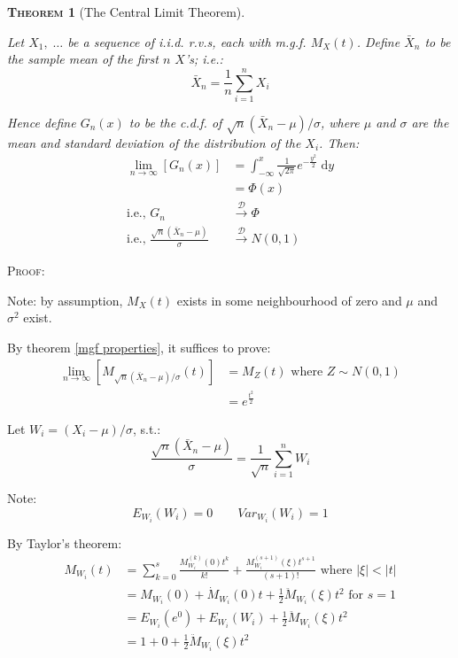 \documentclass[12pt,a4paper]{article}
\newtheorem{theorem}{\textsc{Theorem}}[section]
\newcommand{\diff}{\mathrm{d}}
\begin{document}
\begin{theorem}[The Central Limit Theorem]$\;$\par\vspace{1cm}

Let $X_1,\;\hdots$ be a sequence of i.i.d. r.v.s, each with m.g.f. $M_X(t)$. Define $\bar{X}_n$ to be the sample mean of the first $n$ $X$'s; i.e.:
$$\bar{X}_n = \frac{1}{n}\sum_{i=1}^n X_i$$

Hence define $G_n(x)$ to be the c.d.f. of $\sqrt{n}(\bar{X}_n -\mu)/\sigma$, where $\mu$ and $\sigma$ are the mean and standard deviation of the distribution of the $X_i$. Then:
\begin{align*}
\lim_{n\to\infty}\left[G_n(x)\right] &= \int_{-\infty}^{x}\!\! \frac{1}{\sqrt{2\pi}}e^{-\frac{y^2}{2}}\;\diff y\\
&= \Phi(x)\\
\text{i.e., } G_n &\xrightarrow{\mathscr{D}} \Phi\\
\text{i.e., } \frac{\sqrt{n}\left(\bar{X}_n -\mu\right)}{\sigma} &\xrightarrow{\mathscr{D}} N(0,1)
\end{align*}

\end{theorem}

\noindent\textsc{Proof:}\par\vspace{1cm}

Note: by assumption, $M_X(t)$ exists in some neighbourhood of zero and $\mu$ and $\sigma^2$ exist.

By theorem \ref{mgf properties}, it suffices to prove:
\begin{align*}
\lim_{n\to\infty}\left[M_{\sqrt{n}\left(\bar{X}_n -\mu\right)/\sigma}(t)\right] &= M_Z(t) \mbox{ where $Z\sim N(0,1)$}\\
&= e^{\frac{t^2}{2}}
\end{align*}

Let $W_i =\left(X_i-\mu\right)/\sigma$, s.t.:
$$\frac{\sqrt{n}\left(\bar{X}_n-\mu\right)}{\sigma} = \frac{1}{\sqrt{n}}\sum_{i=1}^n W_i$$

Note:
$$E_{W_i}(W_i) = 0 \qquad Var_{W_i}(W_i) = 1$$

By Taylor's theorem:
\begin{align*}
M_{W_i}(t) &= \sum_{k=0}^s \frac{M_{W_i}^{(k)}(0)t^k}{k!} + \frac{M_{W_i}^{(s+1)}\left(\xi\right)t^{s+1}}{(s+1)!} \mbox{ where $\left|\xi\right|<|t|$}\\
&= M_{W_i}(0) + \dot{M}_{W_i}(0)t + \frac{1}{2}\ddot{M}_{W_i}\left(\xi\right)t^2 \mbox{ for $s=1$}\\
&= E_{W_i}\left(e^0\right) + E_{W_i}\left(W_i\right) + \frac{1}{2}\ddot{M}_{W_i}\left(\xi\right)t^2\\
&= 1 + 0 + \frac{1}{2}\ddot{M}_{W_i}\left(\xi\right)t^2
\end{align*}
\end{document}
